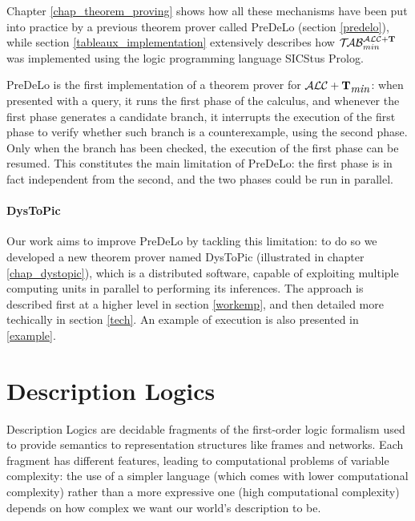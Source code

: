 \documentclass[a4paper, 11pt, oneside]{duthesis}
\newcommand{\tip}{{\bf T}}
\newcommand{\alctmin}{\mathcal{ALC}+\tip_{\mbox{\em min}}}
\newcommand{\nuovoc}{\mathrel{{\mathcal{T}\!\mathcal{AB}}}_{min}^{\mathcal{ALC}+\mbox{\scriptsize $\tip$}}}
\begin{document}
Chapter \ref{chap_theorem_proving} shows how all these mechanisms have been put into practice by a previous theorem prover called PreDeLo (section \ref{predelo}), while section \ref{tableaux_implementation} extensively describes how $\nuovoc$ was implemented using the logic programming language SICStus Prolog.

PreDeLo is the first implementation of a theorem prover for $\alctmin$: when presented with a query, it runs the first phase of the calculus, and whenever the first phase generates a candidate branch, it interrupts the execution of the first phase to verify whether such branch is a counterexample, using the second phase. Only when the branch has been checked, the execution of the first phase can be resumed. This constitutes the main limitation of PreDeLo: the first phase is in fact independent from the second, and the two phases could be run in parallel.

\subsubsection{DysToPic}

Our work aims to improve PreDeLo by tackling this limitation: to do so we developed a new theorem prover named DysToPic (illustrated in chapter \ref{chap_dystopic}), which is a distributed software, capable of exploiting multiple computing units in parallel to performing its inferences.
The approach is described first at a higher level in section \ref{workemp}, and then detailed more techically  in section \ref{tech}. An example of execution is also presented in \ref{example}.

\newpage



\chapter{Description Logics}\label{dl}

Description Logics are decidable fragments of the first-order logic formalism used to provide semantics to representation structures like frames and networks.
Each fragment has different features, leading to computational problems of variable complexity: the use of a simpler language (which comes with lower computational complexity) rather than a more expressive one (high computational complexity) depends on how complex we want our world's description to be.
\end{document}
